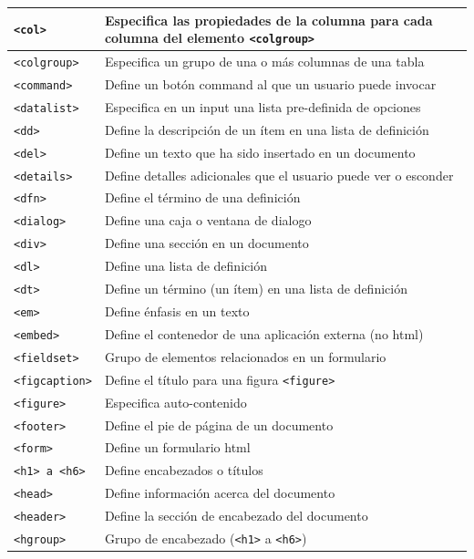 \documentclass[11pt]{scrartcl}
\begin{document}
\begin{longtable}{|p{}|p{}|}
\hline
\texttt{<col>} & Especifica las propiedades de la columna para cada columna del elemento \texttt{<colgroup>} \\
\hline
\texttt{<colgroup>} & Especifica un grupo de una o más columnas de una tabla \\
\hline
\texttt{<command>} & Define un botón command al que un usuario puede invocar \\
\hline
\texttt{<datalist>} & Especifica en un input una lista pre-definida de opciones \\
\hline
\texttt{<dd>} & Define la descripción de un ítem en una lista de definición \\
\hline
\texttt{<del>} & Define un texto que ha sido insertado en un documento \\
\hline
\texttt{<details>} & Define detalles adicionales que el usuario puede ver o esconder \\
\hline
\texttt{<dfn>} & Define el término de una definición \\
\hline
\texttt{<dialog>} & Define una caja o ventana de dialogo \\
\hline
\texttt{<div>} & Define una sección en un documento \\
\hline
\texttt{<dl>} & Define una lista de definición \\
\hline
\texttt{<dt>} & Define un término (un ítem) en una lista de definición \\
\hline
\texttt{<em>} & Define énfasis en un texto \\
\hline
\texttt{<embed>} & Define el contenedor de una aplicación externa (no html) \\
\hline
\texttt{<fieldset>} & Grupo de elementos relacionados en un formulario \\
\hline
\texttt{<figcaption>} & Define el título para una figura \texttt{<figure>} \\
\hline
\texttt{<figure>} & Especifica auto-contenido \\
\hline
\texttt{<footer>} & Define el pie de página de un documento \\
\hline
\texttt{<form>} & Define un formulario html \\
\hline
\texttt{<h1> a <h6>} & Define encabezados o títulos \\
\hline
\texttt{<head>} & Define información acerca del documento \\
\hline
\texttt{<header>} & Define la sección de encabezado del documento \\
\hline
\texttt{<hgroup>} & Grupo de encabezado (\texttt{<h1>} a \texttt{<h6>}) \\

\end{longtable}
\end{document}
